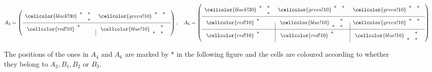 \begin{figure}
	$$ A_4 = \left(\begin{array}{c|c}
		\cellcolor{black!30}\begin{array}{cc} * & * \\  & * \end{array}&\cellcolor{green!10} \begin{array}{cc} * & * \\  &  \end{array}\\
		\hline
		\cellcolor{red!10}\begin{array}{cc} * & \;\text{ }  \\  &  \end{array}& \cellcolor{blue!10}\begin{array}{cc}  & * \\ * & * \end{array}
	\end{array}\right),
	\quad 
	A_6 = \left(\begin{array}{c|c|c} 
		\cellcolor{black!30} \begin{array}{cc} * & * \\ & * \end{array}& \cellcolor{green!10}\begin{array}{cc} * & * \\  &  \end{array} & \cellcolor{green!10} \begin{array}{cc} * & * \\  &  \end{array} \\
		\hline
		\cellcolor{red!10}\begin{array}{cc} * & \;\text{ }  \\  &  \end{array} & \cellcolor{blue!10}  \begin{array}{cc}  & * \\ * & * \end{array} &  \cellcolor{green!10}\begin{array}{cc} * & * \\  &  \end{array}  \\
		\hline
		\cellcolor{red!10}\begin{array}{cc} * & \;\text{ } \\  &  \end{array}& \cellcolor{red!10}\begin{array}{cc} * & \;\text{ } \\  &  \end{array} &  \cellcolor{blue!10}\begin{array}{cc}  & * \\ * & * \end{array} \\
	\end{array}\right)
	$$
	\caption{The positions of the ones in $A_4$ and $A_6$ are marked by $*$ in the following figure and the cells are coloured according to whether they belong to $A_2, B_1, B_2$ or $B_3$.}\label{fig:qubit-matrices}
\end{figure}


